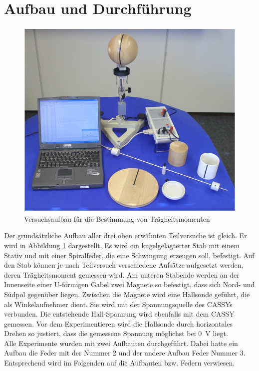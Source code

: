 \documentclass[12pt,a4paper]{article}
\begin{document}
\section{Aufbau und Durchführung}
\begin{figure}
\includegraphics[width=\linewidth]{Bilder/Aufbau.PNG}
\caption{Versuchsaufbau für die Bestimmung von Trägheitsmomenten}
\label{fig:Aufbau}
\end{figure}
Der grundsätzliche Aufbau aller drei oben erwähnten Teilversuche ist gleich. Er wird in Abbildung \ref{fig:Aufbau} dargestellt. Es wird ein kugelgelagterter Stab mit einem Stativ und mit einer Spiralfeder, die eine Schwingung erzeugen soll, befestigt. Auf den Stab können je nach Teilversuch verschiedene Aufsätze aufgesetzt werden, deren Trägheitsmoment gemessen wird. Am unteren Stabende werden an der Innenseite einer U-förmigen Gabel zwei Magnete so befestigt, dass sich Nord- und Südpol gegenüber liegen. Zwischen die Magnete wird eine Hallsonde geführt, die als Winkelaufnehmer dient. Sie wird mit der Spannungsquelle des CASSYs verbunden. Die entstehende Hall-Spannung wird ebenfalls mit dem CASSY gemessen. Vor dem Experimentieren wird die Hallsonde durch horizontales Drehen so justiert, dass die gemessene Spannung möglichst bei \SI{0}{V} liegt. \\
Alle Experimente wurden mit zwei Aufbauten durchgeführt. Dabei hatte ein Aufbau die Feder mit der Nummer 2 und der andere Aufbau Feder Nummer 3. Entsprechend wird im Folgenden auf die Aufbauten bzw. Federn verwiesen.
\end{document}
